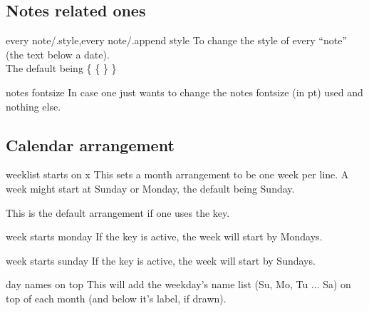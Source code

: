 \documentclass{article}
\begin{document}
\subsection{Notes related ones}
\begin{codedescribe}[key]{every note/.style,every note/.append style}
To change the style of every ``note'' (the text below a date).\\ The default being \{  \{  \} \}
\end{codedescribe}

%
\begin{codedescribe}[key]{notes fontsize}
In case one just wants to change the notes fontsize (in pt) used and nothing else.
\end{codedescribe}

\subsection{Calendar arrangement}
\begin{codedescribe}[key]{weeklist starts on x}
This sets a month arrangement to be one week per line. A week might start at Sunday or Monday, the default being Sunday.
\end{codedescribe}

\begin{tsremark} 
This is the default arrangement if one uses the   key.
\end{tsremark}

\begin{codedescribe}[key]{week starts monday}
If the key  is active, the week will start by Mondays.
\end{codedescribe}

\begin{codedescribe}[key]{week starts sunday }
If the key  is active, the week will start by Sundays.
\end{codedescribe}

\begin{codedescribe}[key]{day names on top}
This will add the weekday's name list (Su, Mo, Tu ... Sa) on top of each month (and below it's label, if drawn).
\end{codedescribe}
\end{document}
